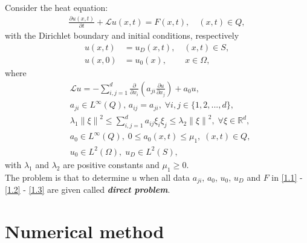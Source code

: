\documentclass[twocolumn]{article}
\begin{document}
Consider the heat equation:
\begin{align}\label{1.1}
	\frac{\partial u(x, t)}{\partial t}+\mathcal{L}u(x, t)=F(x, t), \quad(x, t)\in Q,
\end{align}
with the Dirichlet boundary and initial conditions, respectively
\begin{align}
	u(x, t)&=u_D(x, t),\quad(x, t)\in S, \label{1.2}\\
	u(x, 0)&=u_0(x),\quad\quad\, x\in \Omega,\label{1.3}
\end{align}
where
\begin{align*}
	&\mathcal{L}u = -\sum_{i, j=1}^{d}\frac{\partial}{\partial x_i}\left(a_{ji}\frac{\partial u}{\partial x_j}\right)+a_0u,\\
	&a_{ji}\in L^{\infty}(Q),\, a_{ij}=a_{ji},\; \forall i, j\in \{1, 2, ..., d\},\\
	&\lambda_1\left\|\xi\right\|^2\leq \sum_{i, j=1}^{d}a_{ij}\xi_i\xi_j\leq \lambda_2\left\|\xi\right\|^2,\; \forall \xi\in\mathbb{R}^d,\\
	&a_0\in L^{\infty}(Q),\; 0\leq a_0(x, t)\leq \mu_1,\; (x, t)\in Q,\\ 
	&u_0\in L^2(\Omega),\;u_D\in L^2(S),
\end{align*}
with $\lambda_1$ and $\lambda_2$ are positive constants and $\mu_1\geq 0$.
\\
The problem is that to determine $u$ when all data $a_{ji},\,a_0,\,u_0,\,u_D$ and $F$ in \eqref{1.1} - \eqref{1.2} - \eqref{1.3} are given called \textbf{\textit{direct problem}}. 
\section{Numerical method} 
\end{document}
